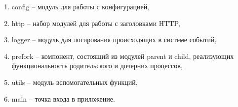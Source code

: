 \begin{enumerate}
	\item config -- модуль для работы с конфигурацией,
	
	\item http -- набор модулей для работы с заголовками HTTP,
	
	\item logger -- модуль для логирования происходящих в системе событий,
	
	\item prefork -- компонент, состоящий из модулей parent и child, реализующих функциональность родительского и дочерних процессов,
	
	\item utils -- модуль вспомогательных функций,
	
	\item main -- точка входа в приложение.
\end{enumerate}

\pagebreak
